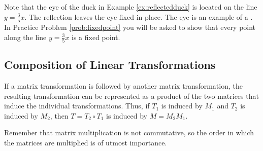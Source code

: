 \documentclass{ximera}
\begin{document}
Note that the eye of the duck in Example \ref{ex:reflectedduck} is located on the line $y=\frac{3}{5}x$.  The reflection leaves the eye fixed in place.  The eye is an example of a .  In Practice Problem \ref{prob:fixedpoint} you will be asked to show that every point along the line $y=\frac{3}{5}x$ is a fixed point.

\subsection*{Composition of Linear Transformations}

If a matrix transformation is followed by another matrix transformation, the resulting transformation can be represented as a product of the two matrices that induce the individual transformations.  Thus, if $T_1$ is induced by $M_1$ and $T_2$ is induced by $M_2$, then $T=T_2\circ T_1$ is induced by $M=M_2M_1$.

\begin{center}
\end{center}

Remember that matrix multiplication is not commutative, so the order in which the matrices are multiplied is of utmost importance.
\end{document}
